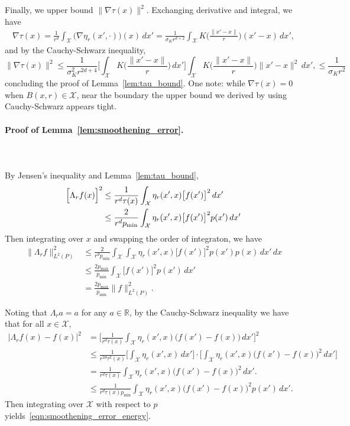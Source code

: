 \documentclass{article}
\newcommand{\Reals}{\mathbb{R}}
\newcommand{\1}{\mathbf{1}}
\newcommand{\Xset}{\mathcal{X}}
\newcommand{\Leb}{L}
\theoremstyle{alden}
\theoremstyle{aldenthm}
\theoremstyle{definition}
\theoremstyle{remark}
\begin{document}
Finally, we upper bound $\|\nabla\tau(x)\|^2$. Exchanging derivative and integral, we have
\begin{align*}
\nabla\tau(x) = \frac{1}{r^d} \int_{\Xset} \bigl(\nabla \eta_r(x',\cdot)\bigr)(x) \,dx' = \frac{1}{\sigma_K r^{d + 2}} \int_{\Xset} K\biggl(\frac{\|x' - x\|}{r}\biggr)(x' - x)\,dx',
\end{align*}
and by the Cauchy-Schwarz inequality,
\begin{equation*}
\|\nabla\tau(x)\|^2 \leq \frac{1}{\sigma_K^2 r^{2d + 4}} \biggl[\int_{\Xset} K\biggl(\frac{\|x' - x\|}{r}\biggr)\,dx'\biggr] \int_{\Xset} K\biggl(\frac{\|x' - x\|}{r}\biggr)\|x' - x\|^2\,dx', \leq \frac{1}{\sigma_K r^{2}}
\end{equation*}
concluding the proof of Lemma~\ref{lem:tau_bound}. One note: while $\nabla\tau(x) = 0$ when $B(x,r) \in \Xset$, near the boundary the upper bound we derived by using Cauchy-Schwarz appears tight. 

\paragraph{Proof of Lemma~\ref{lem:smoothening_error}.}
\mbox{}\\
\mbox{}\\
By Jensen's inequality and Lemma~\ref{lem:tau_bound},
\begin{align*}
\Bigl[\Lambda_rf(x)\Bigr]^2 & \leq \frac{1}{r^d \tau(x)}\int_{\Xset} \eta_r(x',x) \bigl[f(x')\bigr]^2 \,dx' \\
& \leq \frac{2}{r^d p_{\min}}\int_{\Xset} \eta_r(x',x) \bigl[f(x')\bigr]^2 p(x') \,dx'
\end{align*}
Then integrating over $x$ and swapping the order of integraton, we have
\begin{align*}
\bigl\|\Lambda_rf\bigr\|_{\Leb^2(P)}^2 & \leq \frac{2}{r^d p_{\min}} \int_{\Xset} \int_{\Xset} \eta_r(x',x) \bigl[f(x')\bigr]^2 p(x') p(x) \,dx' \,dx \\ 
& \leq \frac{2p_{\max}}{p_{\min}} \int_{\Xset} \bigl[f(x')\bigr]^2 p(x') \,dx' \\
& = \frac{2p_{\max}}{p_{\min}} \|f\|_{\Leb^2(P)}^2.
\end{align*}

Noting that $\Lambda_ra = a$ for any $a \in \Reals$, by the Cauchy-Schwarz inequality we have that for all $x \in \Xset$,
\begin{align*}
\bigl|\Lambda_rf(x) - f(x)\bigr|^2 & = \biggl[\frac{1}{r^d\tau(x)} \int_{\Xset} \eta_r(x',x) \bigl(f(x') - f(x)\bigr) \,dx'\biggr]^2 \\
& \leq \frac{1}{r^{2d} \tau^2(x)} \biggl[\int_{\Xset} \eta_r(x',x) \,dx'\biggr] \cdot \biggl[\int_{\Xset} \eta_r(x',x) \bigl(f(x') - f(x)\bigr)^2 \,dx'\biggr] \\
& = \frac{1}{r^d \tau(x)} \int_{\Xset} \eta_r(x',x) \bigl(f(x') - f(x)\bigr)^2 \,dx'. \\
& \leq \frac{1}{r^d \tau(x) p_{\min}} \int_{\Xset} \eta_r(x',x) \bigl(f(x') - f(x)\bigr)^2 p(x') \,dx'.
\end{align*}
Then integrating over $\Xset$ with respect to $p$ yields~\eqref{eqn:smoothening_error_energy}.
\end{document}
